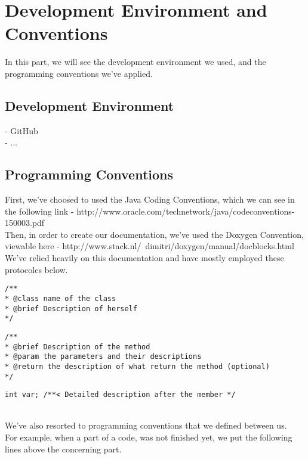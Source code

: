 \section{Development Environment and Conventions}
In this part, we will see the development environment we used, and the programming conventions we've applied.

\subsection{Development Environment}
- GitHub\\
- ...\\

\subsection{Programming Conventions}
First, we've choosed to used the Java Coding Conventions, which we can see in the following link - http://www.oracle.com/technetwork/java/codeconventions-150003.pdf\\

Then, in order to create our documentation, we've used the Doxygen Convention, viewable here - http://www.stack.nl/~dimitri/doxygen/manual/docblocks.html\\
We've relied heavily on this documentation and have mostly employed these protocoles below.\\

\begin{lstlisting}[frame=trBL, title=Doxygen Convention for classes]
/**
* @class name of the class
* @brief Description of herself
*/
\end{lstlisting}

\begin{lstlisting}[frame=trBL, title=Doxygen Convention for methods]
/**
* @brief Description of the method
* @param the parameters and their descriptions
* @return the description of what return the method (optional)
*/
\end{lstlisting}

\begin{lstlisting}[frame=trBL, title=Doxygen Convention for members]
int var; /**< Detailed description after the member */
\end{lstlisting}
~\\
We've also resorted to programming conventions that we defined between us.\\
For example, when a part of a code, was not finished yet, we put the following lines above the concerning part.\\

